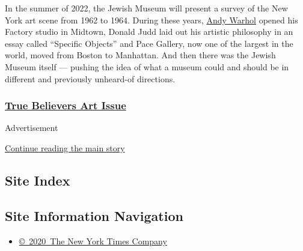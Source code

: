In the summer of 2022, the Jewish Museum will present a survey of the
New York art scene from 1962 to 1964. During these years,
\href{https://www.nytimes3xbfgragh.onion/2018/05/02/t-magazine/andy-warhol-photo-portraits.html}{Andy
Warhol} opened his Factory studio in Midtown, Donald Judd laid out his
artistic philosophy in an essay called ``Specific Objects'' and Pace
Gallery, now one of the largest in the world, moved from Boston to
Manhattan. And then there was the Jewish Museum itself --- pushing the
idea of what a museum could and should be in different and previously
unheard-of directions.

\hypertarget{true-believers-art-issue}{%
\subsubsection{\texorpdfstring{\href{https://www.nytimes3xbfgragh.onion/issue/t-magazine/2020/07/02/true-believers-art-issue}{True
Believers Art
Issue}}{True Believers Art Issue}}\label{true-believers-art-issue}}

Advertisement

\protect\hyperlink{after-bottom}{Continue reading the main story}

\hypertarget{site-index}{%
\subsection{Site Index}\label{site-index}}

\hypertarget{site-information-navigation}{%
\subsection{Site Information
Navigation}\label{site-information-navigation}}

\begin{itemize}
\tightlist
\item
  \href{https://help.nytimes3xbfgragh.onion/hc/en-us/articles/115014792127-Copyright-notice}{©~2020~The
  New York Times Company}
\end{itemize}

